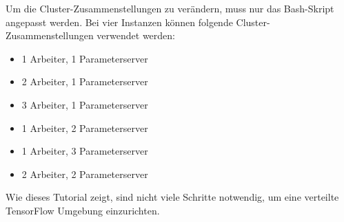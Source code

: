 \vspace{2mm}
Um die Cluster-Zusammenstellungen zu verändern, muss nur das Bash-Skript angepasst werden. Bei vier Instanzen können folgende Cluster-Zusammenstellungen verwendet werden:

\begin{itemize}
	\item 1 Arbeiter, 1 Parameterserver
	\item 2 Arbeiter, 1 Parameterserver
	\item 3 Arbeiter, 1 Parameterserver
	\item 1 Arbeiter, 2 Parameterserver
	\item 1 Arbeiter, 3 Parameterserver
	\item 2 Arbeiter, 2 Parameterserver
\end{itemize}

Wie dieses Tutorial zeigt, sind nicht viele Schritte notwendig, um eine verteilte TensorFlow Umgebung einzurichten. 




